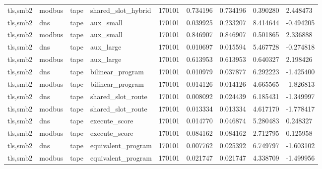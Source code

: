\begin{tabular}{lllllllll}
tls,smb2 & modbus & tape & shared\_slot\_hybrid & 170101 & 0.734196 & 0.734196 & 0.390280 & 2.448473 \\
tls,smb2 & dns & tape & aux\_small & 170101 & 0.039925 & 0.233207 & 8.414644 & -0.494205 \\
tls,smb2 & modbus & tape & aux\_small & 170101 & 0.846907 & 0.846907 & 0.501865 & 2.336888 \\
tls,smb2 & dns & tape & aux\_large & 170101 & 0.010697 & 0.015594 & 5.467728 & -0.274818 \\
tls,smb2 & modbus & tape & aux\_large & 170101 & 0.613953 & 0.613953 & 0.640327 & 2.198426 \\
tls,smb2 & dns & tape & bilinear\_program & 170101 & 0.010979 & 0.037877 & 6.292223 & -1.425400 \\
tls,smb2 & modbus & tape & bilinear\_program & 170101 & 0.014126 & 0.014126 & 4.665565 & -1.826813 \\
tls,smb2 & dns & tape & shared\_slot\_route & 170101 & 0.008092 & 0.024439 & 6.185431 & -1.349997 \\
tls,smb2 & modbus & tape & shared\_slot\_route & 170101 & 0.013334 & 0.013334 & 4.617170 & -1.778417 \\
tls,smb2 & dns & tape & execute\_score & 170101 & 0.014770 & 0.046874 & 5.280483 & 0.248327 \\
tls,smb2 & modbus & tape & execute\_score & 170101 & 0.084162 & 0.084162 & 2.712795 & 0.125958 \\
tls,smb2 & dns & tape & equivalent\_program & 170101 & 0.007762 & 0.025392 & 6.749797 & -1.603102 \\
tls,smb2 & modbus & tape & equivalent\_program & 170101 & 0.021747 & 0.021747 & 4.338709 & -1.499956 \\
\hline
\end{tabular}
